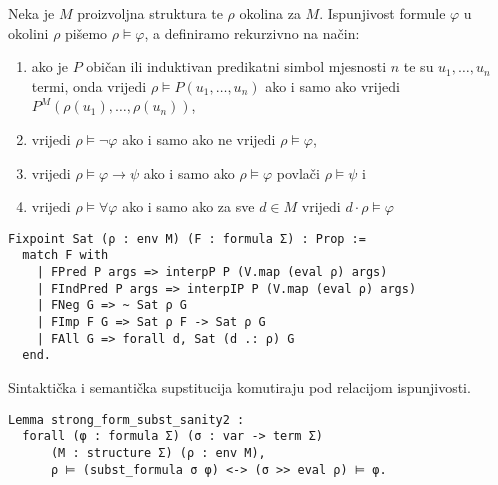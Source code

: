 \begin{definition}
  Neka je \(M\) proizvoljna struktura te \(\rho\) okolina za \(M\).
  Ispunjivost formule \(\varphi\) u okolini \(\rho\) pišemo \(\rho \vDash \varphi\), a definiramo rekurzivno na način:
  \begin{enumerate}
  \item ako je \(P\) običan ili induktivan predikatni simbol mjesnosti \(n\) te su \(u_{1}, \ldots, u_{n}\) termi,
    onda vrijedi \(\rho \vDash P(u_{1}, \ldots, u_{n})\) ako i samo ako vrijedi \(P^{M}(\rho(u_{1}), \ldots, \rho(u_{n}))\),
  \item vrijedi \(\rho \vDash \neg \varphi \) ako i samo ako ne vrijedi \(\rho \vDash \varphi\),
  \item vrijedi \(\rho \vDash \varphi \rightarrow \psi \) ako i samo ako \(\rho \vDash \varphi\) povlači \(\rho \vDash \psi\) i
  \item vrijedi \(\rho \vDash \forall \varphi\) ako i samo ako za sve \(d \in M\) vrijedi \(d \cdot \rho \vDash \varphi\)
  \end{enumerate}
\begin{verbatim}
Fixpoint Sat (ρ : env M) (F : formula Σ) : Prop :=
  match F with
    | FPred P args => interpP P (V.map (eval ρ) args)
    | FIndPred P args => interpIP P (V.map (eval ρ) args)
    | FNeg G => ~ Sat ρ G
    | FImp F G => Sat ρ F -> Sat ρ G
    | FAll G => forall d, Sat (d .: ρ) G
  end.
\end{verbatim}
\end{definition}

\begin{lemma}
  Sintaktička i semantička supstitucija komutiraju pod relacijom ispunjivosti.
\begin{verbatim}
Lemma strong_form_subst_sanity2 :
  forall (φ : formula Σ) (σ : var -> term Σ)
      (M : structure Σ) (ρ : env M),
      ρ ⊨ (subst_formula σ φ) <-> (σ >> eval ρ) ⊨ φ.
\end{verbatim}
\end{lemma}

